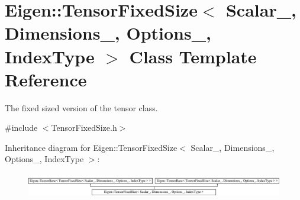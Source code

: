\hypertarget{class_eigen_1_1_tensor_fixed_size}{}\section{Eigen\+:\+:Tensor\+Fixed\+Size$<$ Scalar\+\_\+, Dimensions\+\_\+, Options\+\_\+, Index\+Type $>$ Class Template Reference}
\label{class_eigen_1_1_tensor_fixed_size}


The fixed sized version of the tensor class.  




{\ttfamily \#include $<$Tensor\+Fixed\+Size.\+h$>$}

Inheritance diagram for Eigen\+:\+:Tensor\+Fixed\+Size$<$ Scalar\+\_\+, Dimensions\+\_\+, Options\+\_\+, Index\+Type $>$\+:\begin{figure}[H]
\begin{center}
\leavevmode
\includegraphics[height=1.083172cm]{class_eigen_1_1_tensor_fixed_size}
\end{center}
\end{figure}
